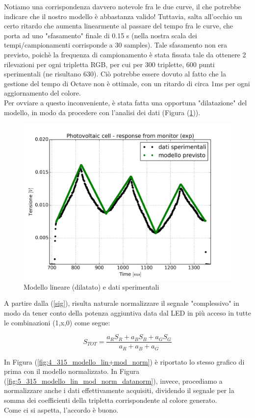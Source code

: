 \documentclass[journal, a4paper]{IEEEtran}
\begin{document}
Notiamo una corrispondenza davvero notevole fra le due curve, il che potrebbe indicare che il nostro modello è abbastanza valido! Tuttavia, salta all'occhio un certo ritardo che aumenta linearmente al passare del tempo fra le curve, che porta ad uno "sfasamento" finale di 0.15 s (nella nostra scala dei tempi/campionamenti corrisponde a 30 samples). Tale sfasamento non era previsto, poichè la frequenza di campionamento è stata fissata tale da ottenere 2 rilevazioni per ogni tripletta RGB, per cui per 300 triplette, 600 punti sperimentali (ne risultano 630). Ciò potrebbe essere dovuto al fatto che la gestione del tempo di Octave non è ottimale, con un ritardo di circa 1ms per ogni aggiornamento del colore.\\
Per ovviare a questo inconveniente, è stata fatta una opportuna "dilatazione" del modello, in modo da procedere con l'analisi dei dati (Figura (\ref{fig:3_315_modello_lin})). \\

\begin{figure}
\centering
\includegraphics[width=0.8\linewidth]{./relaz_colori/3_315_modello_lin}
\caption{Modello lineare (dilatato) e dati sperimentali}
\label{fig:3_315_modello_lin}
\end{figure}


A partire dalla (\ref{sig}), risulta naturale normalizzare il segnale "complessivo" in modo da tener conto della potenza aggiuntiva data dal LED in più acceso in tutte le combinazioni (1,x,0) come segue:

\begin{equation}\label{sig_norm}
S_{TOT} = \frac{a_R S_R + a_B S_B + a_G S_G}{a_R + a_B + a_G}
\end{equation}

In Figura (\ref{fig:4_315_modello_lin+mod_norm}) è riportato lo stesso grafico di prima con il modello normalizzato. In Figura (\ref{fig:5_315_modello_lin_mod_norm_datanorm}), invece, procediamo a normalizzare anche i dati effettivamente acquisiti, dividendo il segnale per la somma dei coefficienti della tripletta corrispondente al colore generato.\\
Come ci si aspetta, l'accordo è buono.\\
\end{document}
